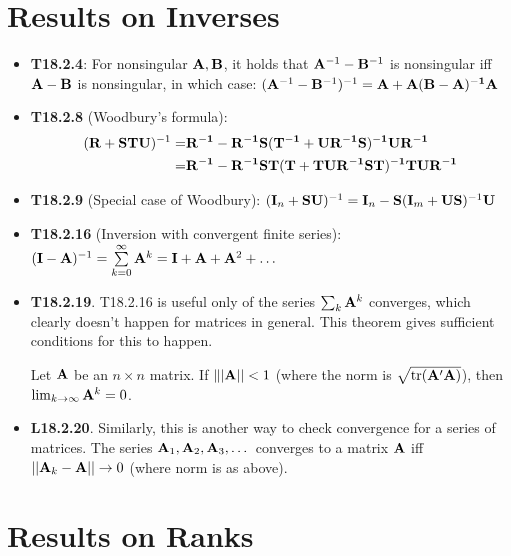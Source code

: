\documentclass[a4paper, oneside]{book}
\begin{document}
\section{Results on Inverses}
\begin{itemize}
\item \textbf{T18.2.4}: For nonsingular $\mathbf{A,B}$, it holds that $\mathbf A^{-1} - \mathbf B^{-1}$ is nonsingular iff $\mathbf{A-B}$ is nonsingular, in which case:
$\mathbf (\mathbf A^{-1} - \mathbf{B}^{-1})^{-1} = \mathbf{A+A(B-A)^{-1}A}$
\item \textbf{T18.2.8} (Woodbury's formula): 
\begin{align*}
(\mathbf{R+STU})^{-1} =& \mathbf{R^{-1}-R^{-1}S(T^{-1}+UR^{-1}S)^{-1}UR^{-1}} \\
=& \mathbf{R^{-1}-R^{-1}ST(T+TUR^{-1}ST)^{-1}TUR^{-1}}
\end{align*}
\item \textbf{T18.2.9} (Special case of Woodbury): $(\mathbf I_n + \mathbf{SU})^{-1} = \mathbf I_n - \mathbf S(\mathbf I_m + \mathbf{US})^{-1}\mathbf U$
\item \textbf{T18.2.16} (Inversion with convergent finite series): $(\mathbf{I-A})^{-1} = \sum\limits_{k=0}^{\infty} \mathbf A^k = \mathbf I + \mathbf A + \mathbf A^2 + \hdots$
\item \textbf{T18.2.19}. T18.2.16 is useful only of the series $ \sum_k \mathbf A^k$ converges, which clearly doesn't happen for matrices in general. This theorem gives sufficient conditions for this to happen.

Let $\mathbf A$ be an $n\times n$ matrix. If $\||\mathbf A||<1$ (where the norm is $\sqrt{\text{tr} (\mathbf{A'A})}$), then $\lim_{k\to\infty} \mathbf A^{k} = 0$.
\item \textbf{L18.2.20}. Similarly, this is another way to check convergence for a series of matrices. The series $\mathbf A_1, \mathbf A_2, \mathbf A_3, \dots$ converges to a matrix $\mathbf A$ iff $||\mathbf A_k-\mathbf A||\to 0$ (where norm is as above).
\end{itemize}


\section{Results on Ranks}
\end{document}
